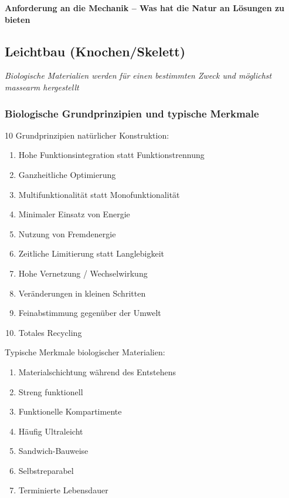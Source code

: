 \textbf{Anforderung an die Mechanik -- Was hat die Natur an Lösungen zu bieten}

\subsection{Leichtbau (Knochen/Skelett)}
\emph{Biologische Materialien werden für einen bestimmten Zweck und möglichst massearm hergestellt}

\subsubsection{Biologische Grundprinzipien und typische Merkmale}
10 Grundprinzipien natürlicher Konstruktion:
\begin{enumerate}
	\item Hohe Funktionsintegration statt Funktionstrennung
	\item Ganzheitliche Optimierung
	\item Multifunktionalität statt Monofunktionalität 
	\item Minimaler Einsatz von Energie
	\item Nutzung von Fremdenergie
	\item Zeitliche Limitierung statt Langlebigkeit
	\item Hohe Vernetzung / Wechselwirkung
	\item Veränderungen in kleinen Schritten
	\item Feinabstimmung gegenüber der Umwelt
	\item Totales Recycling
\end{enumerate}
Typische Merkmale biologischer Materialien:
\begin{enumerate}
	\item Materialschichtung während des Entstehens
	\item Streng funktionell
	\item Funktionelle Kompartimente
	\item Häufig Ultraleicht
	\item Sandwich-Bauweise
	\item Selbstreparabel
	\item Terminierte Lebensdauer
\end{enumerate}

